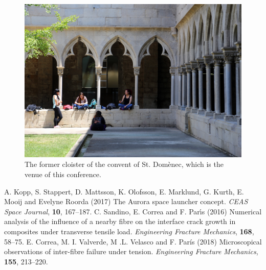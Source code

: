 \documentclass[12pt,a4paper]{article}
\begin{document}
\begin{figure}[h]
\centering\includegraphics[width=0.55\linewidth]{Claustre.pdf}
\caption{The former cloister of the convent of St. Domènec, which is the venue of this conference.}
\label{fig:Claustre}
\end{figure}

\begin{thebibliography}{9}
%
%
 A. Kopp, S. Stappert, D. Mattsson, K. Olofsson, E. Marklund, G. Kurth, E. Mooij and Evelyne Roorda (2017) The Aurora space launcher concept. \textit{CEAS Space Journal}, \textbf{10}, 167--187.
 C. Sandino, E. Correa and F. Par{\'{\i}}s (2016) Numerical analysis of the influence of a nearby fibre on the interface crack growth in composites under transverse tensile load. \textit{Engineering Fracture Mechanics}, \textbf{168}, 58--75.
 E. Correa, M. I. Valverde, M .L. Velasco and F. París (2018) Microscopical observations of inter-fibre failure under tension. \textit{Engineering Fracture Mechanics}, \textbf{155}, 213--220.
%
\end{thebibliography}
\end{document}
